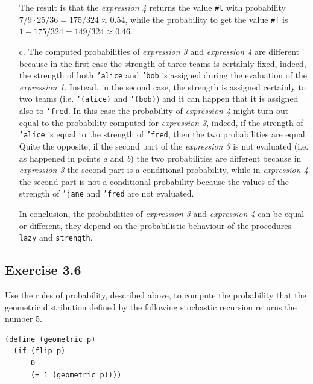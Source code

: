 \begin{itemize}
        The result is that the \textit{expression 4} returns the value \texttt{\#t} with probability $7/9 \cdot 25/36 = 175/324 
        \approx 0.54$, while the probability to get the value \texttt{\#f} is $1 - 175/324 = 149/324 \approx 0.46$.

    \item[c.] The computed probabilities of \textit{expression 3} and \textit{expression 4} are different because in the first case
        the strength of three teams is certainly fixed, indeed, the strength of both \texttt{'alice} and \texttt{'bob} is assigned
        during the evaluation of the \textit{expression 1}. Instead, in the second case, the strength is assigned certainly to two
        teams (i.e. \texttt{'(alice)} and \texttt{'(bob)}) and it can happen that it is assigned also to \texttt{'fred}. In this case
        the probability of \textit{expression 4} might turn out equal to the probability computed for \textit{expression 3}, indeed,
        if the strength of \texttt{'alice} is equal to the strength of \texttt{'fred}, then the two probabilities are equal.
        Quite the opposite, if the second part of the \textit{expression 3} is not evaluated (i.e. as happened in points \textit{a}
        and \textit{b}) the two probabilities are different because in \textit{expression 3} the second part is a conditional
        probability, while in \textit{expression 4} the second part is not a conditional probability because the values of the
        strength of \texttt{'jane} and \texttt{'fred} are not evaluated.

        In conclusion, the probabilities of \textit{expression 3} and \textit{expression 4} can be equal or different, they depend
        on the probabilistic behaviour of the procedures \texttt{lazy} and \texttt{strength}.
\end{itemize}

\subsection*{Exercise 3.6}
Use the rules of probability, described above, to compute the probability that the geometric distribution 
defined by the following stochastic recursion returns the number 5.

\begin{lstlisting}
(define (geometric p)
  (if (flip p)
      0
      (+ 1 (geometric p))))
\end{lstlisting}

